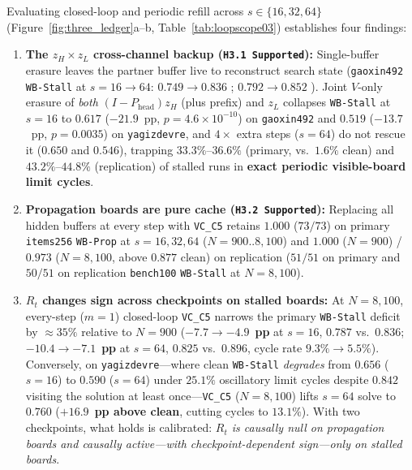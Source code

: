\documentclass[10pt,letterpaper]{article}
\newcommand{\Phead}{P_{\mathrm{head}}}
\begin{document}
Evaluating closed-loop and periodic refill across $s \in \{16, 32, 64\}$ (Figure~\ref{fig:three_ledger}a--b, Table~\ref{tab:loopscope03}) establishes four findings:
\begin{enumerate}[topsep=3pt,itemsep=2pt]
  \item \textbf{The $z_H \times z_L$ cross-channel backup (\texttt{H3.1 Supported}):} Single-buffer erasure leaves the partner buffer live to reconstruct search state (\texttt{gaoxin492} \texttt{WB-Stall} at $s=16 \to 64$: $0.749 \to 0.836$ ; $0.792 \to 0.852$ ). Joint $V$-only erasure of \emph{both} $(I-\Phead)z_H$ (plus prefix) and $z_L$ collapses \texttt{WB-Stall} at $s=16$ to $\mathbf{0.617}$ ($-21.9$~pp, $p=4.6\times 10^{-10}$) on \texttt{gaoxin492} and $\mathbf{0.519}$ ($-13.7$~pp, $p=0.0035$) on \texttt{yagizdevre}, and $4\times$ extra steps ($s=64$) do not rescue it ($0.650$ and $0.546$), trapping $\mathbf{33.3\%}$--$\mathbf{36.6\%}$ (primary, vs.\ $1.6\%$ clean) and $\mathbf{43.2\%}$--$\mathbf{44.8\%}$ (replication) of stalled runs in \textbf{exact periodic visible-board limit cycles}.
  \item \textbf{Propagation boards are pure cache (\texttt{H3.2 Supported}):} Replacing all hidden buffers at every step with \texttt{VC\_C5} retains $\mathbf{1.000}$ ($73/73$) on primary \texttt{items256} \texttt{WB-Prop} at $s=16, 32, 64$ ($N=900..8{,}100$) and $1.000$ ($N=900$) / $0.973$ ($N=8{,}100$, above $0.877$ clean) on replication ($51/51$ on primary and $50/51$ on replication \texttt{bench100} \texttt{WB-Stall} at $N=8{,}100$).
  \item \textbf{$R_t$ changes sign across checkpoints on stalled boards:} At $N=8{,}100$, every-step ($m=1$) closed-loop \texttt{VC\_C5} narrows the primary \texttt{WB-Stall} deficit by $\approx 35\%$ relative to $N=900$ ($-7.7 \to \mathbf{-4.9}$~\textbf{pp} at $s=16$, $0.787$ vs.\ $0.836$; $-10.4 \to \mathbf{-7.1}$~\textbf{pp} at $s=64$, $0.825$ vs.\ $0.896$, cycle rate $9.3\% \to 5.5\%$). Conversely, on \texttt{yagizdevre}—where clean \texttt{WB-Stall} \emph{degrades} from $0.656$ ($s=16$) to $\mathbf{0.590}$ ($s=64$) under $25.1\%$ oscillatory limit cycles despite $0.842$ visiting the solution at least once—\texttt{VC\_C5} ($N=8{,}100$) lifts $s=64$ solve to $\mathbf{0.760}$ ($\mathbf{+16.9}$~\textbf{pp above clean}, cutting cycles to $13.1\%$). With two checkpoints, what holds is calibrated: \emph{$R_t$ is causally null on propagation boards and causally active—with checkpoint-dependent sign—only on stalled boards}.

\end{enumerate}
\end{document}
